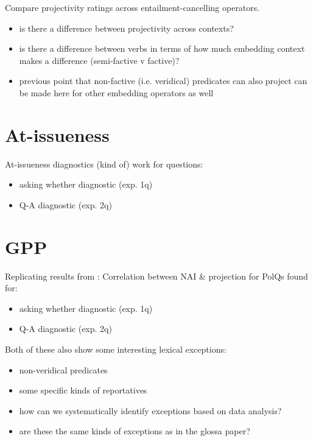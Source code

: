 \documentclass[11pt,fleqn]{article}
\newcommand{\6}{\mbox{$[\hspace*{-.6mm}[$}}
\newcommand{\9}{\mbox{$]\hspace*{-.6mm}]$}}
\begin{document}
Compare projectivity ratings across entailment-cancelling operators. 
\begin{itemize}
  \item is there a difference between projectivity across contexts? 
  \item is there a difference between verbs in terms of how much embedding context makes a difference (semi-factive v factive)?
  \item previous point that non-factive (i.e. veridical) predicates can also project can be made here for other embedding operators as well
\end{itemize}

\section{At-issueness}

At-issueness diagnostics (kind of) work for questions:
\begin{itemize}
  \item asking whether diagnostic (exp. 1q)
  \item Q-A diagnostic (exp. 2q)
\end{itemize}


\section{GPP}

Replicating results from \cite{tbd-variability}: Correlation between NAI \& projection for PolQs found for:
\begin{itemize}
  \item asking whether diagnostic (exp. 1q)
  \item Q-A diagnostic (exp. 2q)
\end{itemize}

\noindent Both of these also show some interesting lexical exceptions:
\begin{itemize}
  \item non-veridical predicates
  \item some specific kinds of reportatives
  \item how can we systematically identify exceptions based on data analysis?
  \item are these the same kinds of exceptions as in the glossa paper?
\end{itemize}
\end{document}
